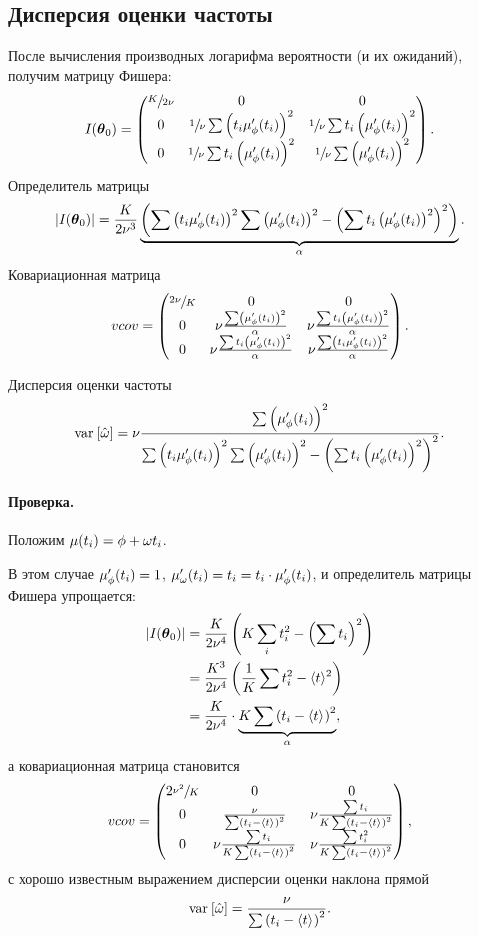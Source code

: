 \subsection{Дисперсия оценки частоты}
После вычисления производных логарифма вероятности (и их ожиданий), получим матрицу Фишера: 
\[
\Fisher = \begin{pmatrix}
\sfrac{K}{2\nu} & 0 								& 0 \\
0 				& \sfrac1\nu\sum\bkt{t_i\mupp}^2	& \sfrac1\nu\sum t_i\bkt{\mupp}^2 \\
0				& \sfrac1\nu\sum t_i\bkt{\mupp}^2	&\sfrac1\nu\sum\bkt{\mupp}^2
\end{pmatrix}.
\]
Определитель матрицы
\newcommand{\STM}{\alpha}
\[
|\Fisher| = \frac{K}{2\nu^3}\underbrace{\bkt{\sum\bkt{t_i\mupp}^2\sum\bkt{\mupp}^2 - \bkt{\sum t_i\bkt{\mupp}^2}^2}}_{\STM}.
\]
Ковариационная матрица
\[
vcov = \begin{pmatrix}
\sfrac{2\nu}{K}& 0									& 0				\\
0				&\nu\frac{\sum\bkt{\mupp}^2}{\STM}		&\nu\frac{\sum t_i\bkt{\mupp}^2}{\STM}\\
0				&\nu\frac{\sum t_i\bkt{\mupp}^2}{\STM}	&\nu\frac{\sum\bkt{t_i\mupp}^2}{\STM}
\end{pmatrix}.
\]

Дисперсия оценки частоты
\begin{equation}\label{eq:Var1}
\var{\hat{\w}} = \nu\frac{\sum\bkt{\mupp}^2}{\sum\bkt{t_i\mupp}^2\sum\bkt{\mupp}^2 - \bkt{\sum t_i\bkt{\mupp}^2}^2}.
\end{equation}

\paragraph{Проверка.} Положим ${\mu(t_i) = \phi + \omega t_i}$. 

В этом случае ${\mupp = 1}$, 
${\mu'_\w(t_i) = t_i = t_i\cdot\mupp}$, и определитель матрицы Фишера упрощается:
\begin{align*}
|\Fisher| &= \frac{K}{2\nu^4}\bkt{K\sum_i t_i^2 - \bkt{\sum t_i}^2} \\
&= \frac{K^3}{2\nu^4}\bkt{\frac1K\sum t_i^2 - \avg{t}^2} \\
&= \frac{K}{2\nu^4}\cdot\underbrace{K\sum\bkt{t_i - \avg{t}}^2}_{\STM},
\end{align*}
\newcommand{\SSX}{\sum\bkt{t_i - \avg{t}}^2}
а ковариационная матрица становится
\[
vcov = \begin{pmatrix}
2\sfrac{\nu^2}{K}& 0									& 0				\\
0				&\frac{\nu}{\SSX}		&\nu\frac{\sum t_i}{K\SSX}\\
0				&\nu\frac{\sum t_i}{K\SSX}	&\nu\frac{\sum t_i^2}{K\SSX}
\end{pmatrix},
\]
с хорошо известным выражением дисперсии оценки наклона прямой
\[
\var{\hat\w} = \frac{\nu}{\SSX}.
\]

